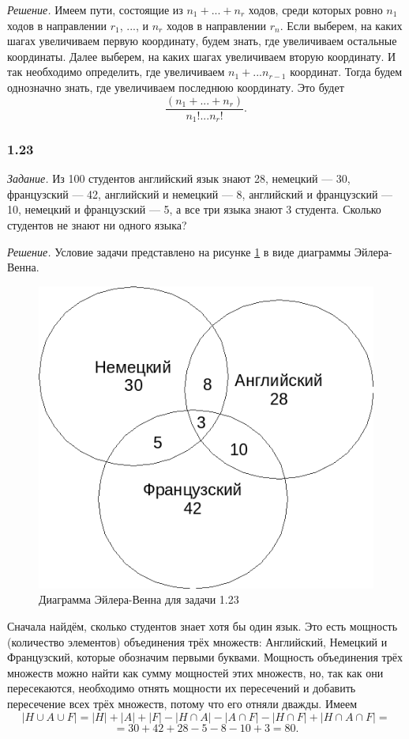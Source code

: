 \documentclass{book}
\begin{document}
\textit{Решение.} Имеем пути, состоящие из $n_1+...+n_r$ ходов, среди которых ровно $n_1$ ходов в направлении $r_1$, ..., и $n_r$ ходов в направлении $r_n$. Если выберем, на каких шагах увеличиваем первую координату, будем знать, где увеличиваем остальные координаты. Далее выберем, на каких шагах увеличиваем вторую координату. И так необходимо определить, где увеличиваем $n_1+...n_{r-1}$ координат. Тогда будем однозначно знать, где увеличиваем последнюю координату. Это будет $$\frac{\left(n_1+...+n_r\right)}{n_1!...n_r!}.$$

\subsubsection*{1.23}

\textit{Задание.} Из 100 студентов английский язык знают 28, немецкий --- 30, французский --- 42, английский и немецкий --- 8, английский и французский --- 10, немецкий и французский --- 5, а все три языка знают 3 студента. Сколько студентов не знают ни одного языка?

\textit{Решение.} Условие задачи представлено на рисунке \ref{fig:123} в виде диаграммы Эйлера-Венна. 

\begin{figure}[h!]
  \centering
  \includegraphics[width=.4\textwidth]{./pictures/1_23.png}
  \caption{Диаграмма Эйлера-Венна для задачи 1.23}
  \label{fig:123}
\end{figure}

Сначала найдём, сколько студентов знает хотя бы один язык. Это есть мощность (количество элементов) объединения трёх множеств: Английский, Немецкий и Французский, которые обозначим первыми буквами. Мощность объединения трёх множеств можно найти как сумму мощностей этих множеств, но, так как они пересекаются, необходимо отнять мощности их пересечений и добавить пересечение всех трёх множеств, потому что его отняли дважды. Имеем $$|H\cup A\cup F|=|H|+|A|+|F|-|H\cap A|-|A\cap F|-|H\cap F|+|H\cap A\cap F|=$$$$=30+42+28-5-8-10+3=80.$$
\end{document}
